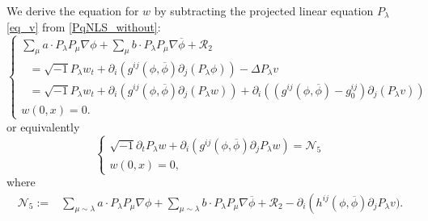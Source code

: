 \documentclass[10pt,twoside,a4paper]{article}
\numberwithin{equation}{section}\allowdisplaybreaks
\begin{document}
	We derive the equation for $w$ by subtracting the projected linear equation $P_{\lambda}$\eqref{eq_v} from \eqref{PqNLS_without}:
	\begin{equation}\label{eq_w0} 
		\begin{cases}
			\sum_{\mu} a \cdot  P_{\lambda}   P_\mu \nabla \phi + \sum_{\mu} b\cdot  P_{\lambda }   P_\mu \nabla\overline{ \phi }+\mathcal{R}_2\\
			~~~=\sqrt{-1}  P_{\lambda }   w_t+\partial_i\left( g^{ij}\left(\phi,\overline{\phi}\right)   \partial_j (P_{\lambda } \phi)\right)- \Delta  P_{\lambda }  v \\
			~~~ =\sqrt{-1}  P_{\lambda }  w_t+ \partial_i\left( g^{ij}\left(\phi,\overline{\phi}\right) \partial_j  ( P_{\lambda }  w)\right)+ \partial_i\left( (g^{ij}\left(\phi,\overline{\phi}\right) -g_0^{i j}) \partial_j  (P_{\lambda }  v)\right) \\
			w(0,x)=0.
		\end{cases}	
	\end{equation}
	or equivalently
	\begin{equation} \label{eq_w}
		\begin{cases}
			\sqrt{-1}  \partial_t  P_{\lambda }  w+ \partial_i\left( g^{ij}\left(\phi,\overline{\phi}\right) \partial_j  P_{\lambda }  w\right)=\mathcal{N}_5\\
			w(0,x)=0,
		\end{cases}
	\end{equation}
	where
	\begin{align*}
		\mathcal{N}_5:=	&\sum_{\mu\sim \lambda} a \cdot  P_{\lambda }   P_\mu \nabla \phi + \sum_{\mu\sim \lambda} b\cdot  P_{\lambda }   P_\mu \nabla\overline{ \phi }+\mathcal{R}_2 - \partial_i\left( h^{ij}\left(\phi,\overline{\phi}\right)   \partial_j  P_{\lambda }  v).\right.
	\end{align*}
	
\end{document}
